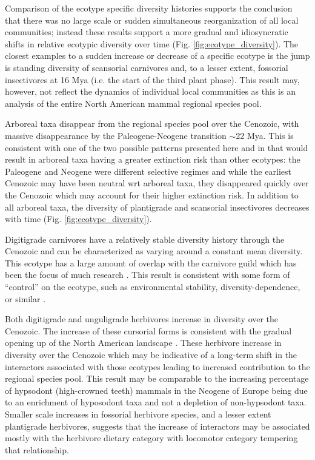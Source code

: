 \documentclass[12pt,letterpaper]{article}
\begin{document}
Comparison of the ecotype specific diversity histories supports the conclusion that there was no large scale or sudden simultaneous reorganization of all local communities; instead these results support a more gradual and idiosyncratic shifts in relative ecotypic diversity over time (Fig. \ref{fig:ecotype_diversity}). The closest examples to a sudden increase or decrease of a specific ecotype is the jump is standing diversity of scansorial carnivores and, to a lesser extent, fossorial insectivores at 16 Mya (i.e. the start of the third plant phase). This result may, however, not reflect the dynamics of individual local communities as this is an analysis of the entire North American mammal regional species pool.

Arboreal taxa disappear from the regional species pool over the Cenozoic, with massive disappearance by the Paleogene-Neogene transition \(\sim\)22 Mya. This is consistent with one of the two possible patterns presented here and in \citet{Smits2015b} that would result in arboreal taxa having a greater extinction risk than other ecotypes: the Paleogene and Neogene were different selective regimes and while the earliest Cenozoic may have been neutral wrt arboreal taxa, they disappeared quickly over the Cenozoic which may account for their higher extinction risk. In addition to all arboreal taxa, the diversity of plantigrade and scansorial insectivores decreases with time (Fig. \ref{fig:ecotype_diversity}).

Digitigrade carnivores have a relatively stable diversity history through the Cenozoic and can be characterized as varying around a constant mean diversity. This ecotype has a large amount of overlap with the carnivore guild which has been the focus of much research \citep{Slater2015c,Valkenburgh1999,Pires2015a,Janis1993c}. This result is consistent with some form of ``control'' on the ecotype, such as environmental stability, diversity-dependence, or similar \citep{Slater2015c,Silvestro2015b,Valkenburgh1999}.

Both digitigrade and unguligrade herbivores increase in diversity over the Cenozoic. The increase of these cursorial forms is consistent with the gradual opening up of the North American landscape \citep{Blois2009,Stromberg2005,Graham2011a}. These herbivore increase in diversity over the Cenozoic which may be indicative of a long-term shift in the interactors associated with those ecotypes leading to increased contribution to the regional species pool. This result may be comparable to the increasing percentage of hypsodont (high-crowned teeth) mammals in the Neogene of Europe being due to an enrichment of hyposodont taxa and not a depletion of non-hypsodont taxa. Smaller scale increases in fossorial herbivore species, and a lesser extent plantigrade herbivores, suggests that the increase of interactors may be associated mostly with the herbivore dietary category with locomotor category tempering that relationship.
\end{document}
